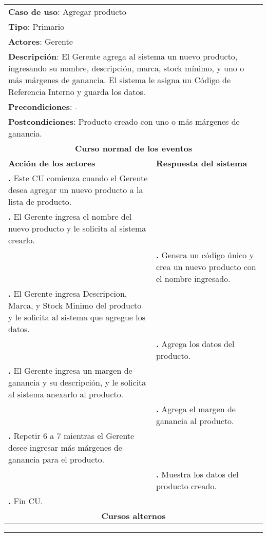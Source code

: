 \documentclass[12pt]{extarticle}
\begin{document}
    \newcommand\inc{\stepcounter{step}\textbf{\thestep. }}
    \newcommand\resetinc{\setcounter{step}{0}}
    \newcommand\raya{\noindent\rule{169mm}{0.8mm}\\}


\begin{longtable}{ |p{8cm}|p{8cm}| }
		\hline
		\multicolumn{2}{|p{16cm}|}{\textbf{Caso de uso}: Agregar producto}\\
		\multicolumn{2}{|p{16cm}|}{\textbf{Tipo}: Primario}\\
		\multicolumn{2}{|p{16cm}|}{\textbf{Actores}: Gerente}\\
		\multicolumn{2}{|p{16cm}|}{\textbf{Descripción}: El Gerente agrega al sistema un nuevo producto, ingresando su nombre, descripción, marca, stock mínimo, y uno o más márgenes de ganancia. El sistema le asigna un Código de Referencia Interno y guarda los datos.}\\
		\multicolumn{2}{|p{16cm}|}{\textbf{Precondiciones}: - }\\
		\multicolumn{2}{|p{16cm}|}{\textbf{Postcondiciones}: Producto creado con uno o más márgenes de ganancia.}\\
		\hline
		\multicolumn{2}{|c|}{\textbf{Curso normal de los eventos}}\\
		\hline
		\textbf{Acción de los actores} & \textbf{Respuesta del sistema}\\
		\hline
			\inc Este CU comienza cuando el Gerente desea agregar un nuevo producto a la lista de producto.&\\
			\hline
			\inc El Gerente ingresa el nombre del nuevo producto y le solicita al sistema crearlo.&\\
			\hline
			& \inc Genera un código único y crea un nuevo producto con el nombre ingresado.\\
			\hline
			\inc El Gerente ingresa Descripcion, Marca, y Stock Minimo del producto y le solicita al sistema que agregue los datos. &\\
			\hline
			& \inc Agrega los datos del producto.\\
			\hline
			\inc El Gerente ingresa un margen de ganancia y su descripción, y le solicita al sistema anexarlo al producto.&\\
			\hline
			& \inc Agrega el margen de ganancia al producto. \\
			\hline
			\inc Repetir 6 a 7 mientras el Gerente desee ingresar más márgenes de ganancia para el producto.&\\
			\hline
			& \inc Muestra los datos del producto creado. \\
			\hline
			\inc Fin CU. & \\
		\hline
		\multicolumn{2}{|c|}{\textbf{Cursos alternos}}\\
		\hline
	\end{longtable}

	    \resetinc{}
	    \raya{}
	
\end{document}
